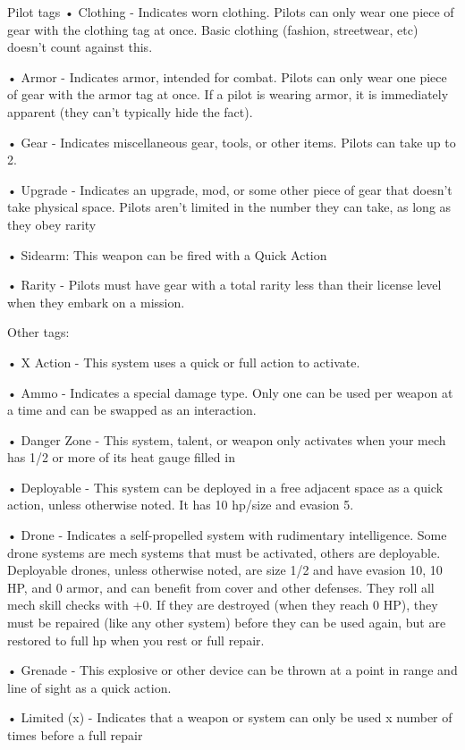 Pilot tags
•  Clothing - Indicates worn clothing. Pilots can only wear one piece of gear with the clothing tag
  at once. Basic clothing (fashion, streetwear, etc) doesn’t count against this.

•  Armor - Indicates armor, intended for combat. Pilots can only wear one piece of gear with the
  armor tag at once. If a pilot is wearing armor, it is immediately apparent (they can’t typically
  hide the fact).

•  Gear - Indicates miscellaneous gear, tools, or other items. Pilots can take up to 2.

•  Upgrade - Indicates an upgrade, mod, or some other piece of gear that doesn’t take physical
  space. Pilots aren’t limited in the number they can take, as long as they obey rarity

•  Sidearm: This weapon can be fired with a Quick Action

•  Rarity - Pilots must have gear with a total rarity less than their license level when they embark
  on a mission.

Other tags:

•  X Action - This system uses a quick or full action to activate.





•  Ammo - Indicates a special damage type. Only one can be used per weapon at a time and can
  be swapped as an interaction.

•  Danger Zone - This system, talent, or weapon only activates when your mech has 1/2 or more
  of its heat gauge filled in

•  Deployable - This system can be deployed in a free adjacent space as a quick action, unless
  otherwise noted. It has 10 hp/size and evasion 5.

•  Drone - Indicates a self-propelled system with rudimentary intelligence. Some drone systems
  are mech systems that must be activated, others are deployable. Deployable drones, unless
  otherwise noted, are size 1/2 and have evasion 10, 10 HP, and 0 armor, and can benefit from
  cover and other defenses. They roll all mech skill checks with +0. If they are destroyed (when
  they reach 0 HP), they must be repaired (like any other system) before they can be used again,
  but are restored to full hp when you rest or full repair.

•  Grenade - This explosive or other device can be thrown at a point in range and line of sight as
  a quick action.

•  Limited (x) - Indicates that a weapon or system can only be used x number of times before a
  full repair

